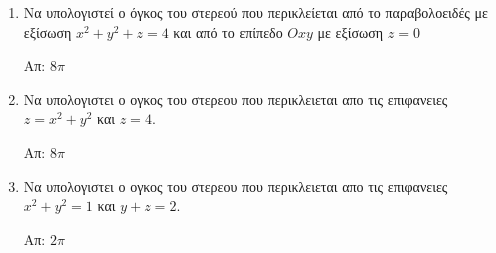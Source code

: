 \begin{enumerate}

\item Να υπολογιστεί ο όγκος του στερεού που περικλείεται από το παραβολοειδές με εξίσωση $x^2+y^2+z=4$ και από το επίπεδο $Oxy$ με εξίσωση $z=0$

\hfill Απ: $8\pi$

\item Να υπολογιστει ο ογκος του στερεου που περικλειεται απο τις επιφανειες $z=x^2+y^2$ και $z=4$.

\hfill Απ: $8\pi$

\item Να υπολογιστει ο ογκος του στερεου που περικλειεται απο τις επιφανειες $x^2+y^2=1$ και $y+z=2$. 

\hfill Απ: $2\pi$



\end{enumerate}


